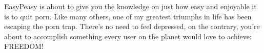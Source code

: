 \documentclass[easypeasy.tex]{subfiles}
\begin{document}
EasyPeasy is about to give you the knowledge on just how easy and enjoyable it is to quit porn. Like many others, one of my greatest triumphs in life has been escaping the porn trap. There's no need to feel depressed, on the contrary, you're about to accomplish something every user on the planet would love to achieve: FREEDOM!
\end{document}

